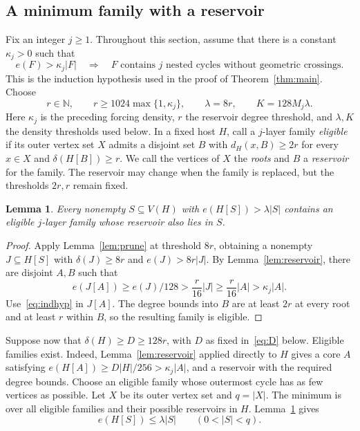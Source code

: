 \documentclass[10pt,letterpaper]{article}
\newtheorem{lemma}[theorem]{Lemma}
\theoremstyle{definition}
\theoremstyle{remark}
\begin{document}
\subsection{A minimum family with a reservoir}

Fix an integer $j\ge1$. Throughout this section, assume that there is a constant $\kappa_j>0$ such that
\begin{equation}\label{eq:indhyp}
e(F)>\kappa_j|F|
\quad\Longrightarrow\quad
F\text{ contains }j\text{ nested cycles without geometric crossings}.
\end{equation}
This is the induction hypothesis used in the proof of Theorem~\ref{thm:main}. Choose
\begin{equation}\label{eq:rK}
r\in\mathbb N,\qquad
r\ge1024\max\{1,\kappa_j\},\qquad
\lambda=8r,\qquad K=128M_j\lambda.
\end{equation}
Here $\kappa_j$ is the preceding forcing density, $r$ the reservoir degree threshold, and $\lambda,K$ the density thresholds used below.
In a fixed host $H$, call a $j$-layer family \emph{eligible} if its outer vertex set $X$ admits a disjoint set $B$ with $d_H(x,B)\ge2r$ for every $x\in X$ and $\delta(H[B])\ge r$. We call the vertices of $X$ the \emph{roots} and $B$ a \emph{reservoir} for the family. The reservoir may change when the family is replaced, but the thresholds $2r,r$ remain fixed.

\begin{lemma}\label{lem:denseeligible}
Every nonempty $S\subseteq V(H)$ with $e(H[S])>\lambda|S|$ contains an eligible $j$-layer family whose reservoir also lies in $S$.
\end{lemma}
\begin{proof}
Apply Lemma~\ref{lem:prune} at threshold $8r$, obtaining a nonempty $J\subseteq H[S]$ with $\delta(J)\ge8r$ and $e(J)>8r|J|$. By Lemma~\ref{lem:reservoir}, there are disjoint $A,B$ such that
\[
e(J[A])\ge e(J)/128>\frac r{16}|J|
\ge\frac r{16}|A|>\kappa_j|A|.
\]
Use~\eqref{eq:indhyp} in $J[A]$. The degree bounds into $B$ are at least $2r$ at every root and at least $r$ within $B$, so the resulting family is eligible.
\end{proof}

Suppose now that $\delta(H)\ge D\ge128r$, with $D$ as fixed in~\eqref{eq:D} below. Eligible families exist. Indeed, Lemma~\ref{lem:reservoir} applied directly to $H$ gives a core $A$ satisfying $e(H[A])\ge D|H|/256>\kappa_j|A|$, and a reservoir with the required degree bounds. Choose an eligible family whose outermost cycle has as few vertices as possible. Let $X$ be its outer vertex set and $q=|X|$. The minimum is over all eligible families and their possible reservoirs in $H$. Lemma~\ref{lem:denseeligible} gives
\begin{equation}\label{eq:MIN}
e(H[S])\le\lambda|S|\qquad(0<|S|<q).
\end{equation}
\end{document}
